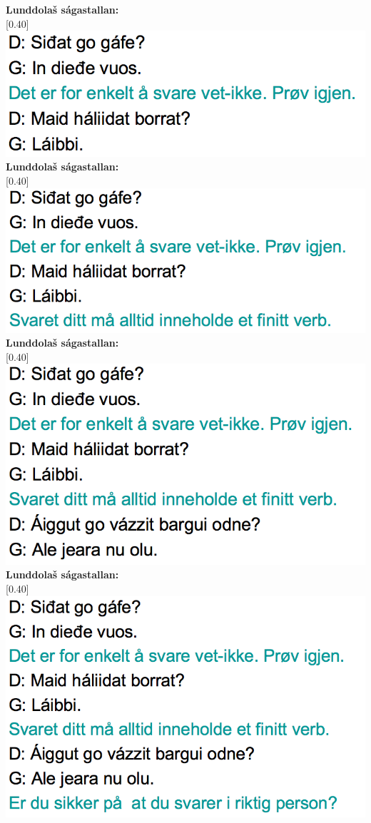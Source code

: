 \documentclass[landscape,norsk,11pt]{seminar}
\begin{document}
\begin{slide}
\newslide
\textbf{Lunddolaš ságastallan:} \\

\scalebox{0.40}[0.40]{\includegraphics{img/lgiella3.png}} 
\newslide
\textbf{Lunddolaš ságastallan:} \\

\scalebox{0.40}[0.40]{\includegraphics{img/lgiella4.png}} 
\newslide
\textbf{Lunddolaš ságastallan:} \\

\scalebox{0.40}[0.40]{\includegraphics{img/lgiella5.png}} 
\newslide
\textbf{Lunddolaš ságastallan:} \\

\scalebox{0.40}[0.40]{\includegraphics{img/lgiella6.png}} 



\end{slide}
\end{document}
